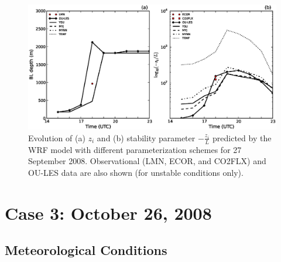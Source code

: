 \begin{figure}[ht!]
\begin{center}
\includegraphics[width=\textwidth]{figures/chapter4/pblh_phi_phys_20080927}
\end{center}
\caption{Evolution of (a) $z_i$ and (b) stability parameter $-\frac{z_i}{L}$ predicted by the WRF model with different parameterization schemes for 27 September 2008. Observational (LMN, ECOR, and CO2FLX) and OU-LES data are also shown (for unstable conditions only).}
\label{figure417}
\end{figure}


\section{Case 3: October 26, 2008}
\label{oct26-45}

\subsection{Meteorological Conditions}
\label{mc-451}


